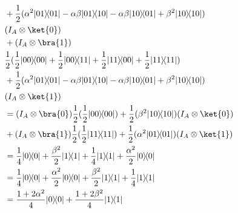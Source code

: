\documentclass{article}
\newcommand{\ketbra}[2]{|#1\rangle\!\langle #2|}
\begin{document}
\begin{enumerate}
$$\begin{aligned}
                           & + \frac{1}{2}(\alpha^2\ketbra{01}{01}-\alpha\beta\ketbra{01}{10}-\alpha\beta\ketbra{10}{01}+\beta^2\ketbra{10}{10})                                                                                                  \\
                           & (I_A\otimes\ket{0})                                                                                                                                                                                                  \\
                           & +(I_A\otimes\bra{1})                                                                                                                                                                                                 \\
                           & \frac{1}{2}(\frac12\ketbra{00}{00}+\frac12\ketbra{00}{11}+\frac12\ketbra{11}{00}+\frac12\ketbra{11}{11})                                                                                                             \\
                           & + \frac{1}{2}(\alpha^2\ketbra{01}{01}-\alpha\beta\ketbra{01}{10}-\alpha\beta\ketbra{10}{01}+\beta^2\ketbra{10}{10})                                                                                                  \\
                           & (I_A\otimes\ket{1})                                                                                                                                                                                                  \\
                           & =(I_A\otimes\bra{0})\frac{1}{2}(\frac12\ketbra{00}{00})+\frac{1}{2}(\beta^2\ketbra{10}{10})(I_A\otimes\ket{0})                                                                                                       \\
                           & +(I_A\otimes\bra{1})\frac{1}{2}(\frac12\ketbra{11}{11})+ \frac{1}{2}(\alpha^2\ketbra{01}{01})(I_A\otimes\ket{1})                                                                                                     \\
                           & =\frac{1}{4}\ketbra{0}{0}+\frac{\beta^2}{2}\ketbra{1}{1}+\frac{1}{4}\ketbra{1}{1}+\frac{\alpha^2}{2}\ketbra{0}{0}                                                                                                    \\
                           & =\frac{1}{4}\ketbra{0}{0}+\frac{\alpha^2}{2}\ketbra{0}{0}+\frac{\beta^2}{2}\ketbra{1}{1}+\frac{1}{4}\ketbra{1}{1}                                                                                                    \\
                           & =\frac{1+2\alpha^2}{4}\ketbra{0}{0}+\frac{1+2\beta^2}{4}\ketbra{1}{1}                                                                                                                                                \\
          \end{aligned}$$


\end{enumerate}
\end{document}
